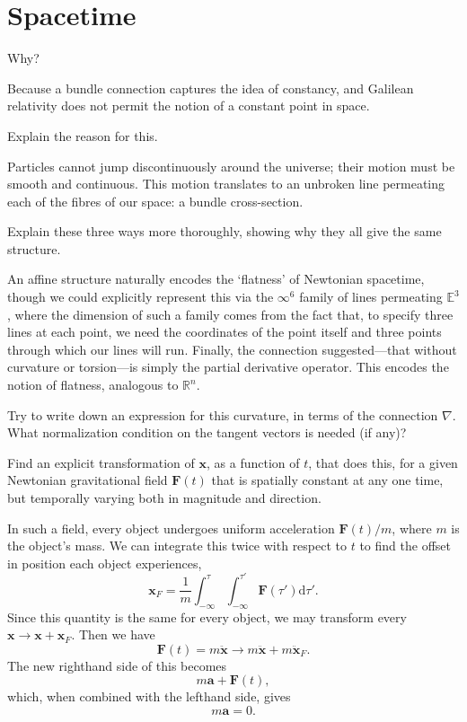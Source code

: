 \documentclass[../the-road-to-reality.tex]{subfiles}
\begin{document}
\section{Spacetime}

\begin{questions}

	\question Why?

	\begin{solution}
		Because a bundle connection captures the idea of constancy, and Galilean relativity does not permit the notion of a constant point in space.
	\end{solution}

	\question Explain the reason for this.

	\begin{solution}
		Particles cannot jump discontinuously around the universe; their motion must be smooth and continuous. This motion translates to an unbroken line permeating each of the fibres of our space: a bundle cross-section.	
	\end{solution}

	\question Explain these three ways more thoroughly, showing why they all give the same structure.

	\begin{solution}
		An affine structure naturally encodes the `flatness' of Newtonian spacetime, though we could explicitly represent this via the $\infty^6$ family of lines permeating $\mathbb{E}^3$, where the dimension of such a family comes from the fact that, to specify three lines at each point, we need the coordinates of the point itself and three points through which our lines will run. Finally, the connection suggested---that without curvature or torsion---is simply the partial derivative operator. This encodes the notion of flatness, analogous to $\mathbb{R}^n$.
	\end{solution}

	\question Try to write down an expression for this curvature, in terms of the connection $\nabla$. What normalization condition on the tangent vectors is needed (if any)?

	\question Find an explicit transformation of $\mathbf{x}$, as a function of $t$, that does this, for a given Newtonian gravitational field $\mathbf{F}(t)$ that is spatially constant at any one time, but temporally varying both in magnitude and direction.

	\begin{solution}
		In such a field, every object undergoes uniform acceleration $\mathbf{F}(t)/m$, where $m$ is the object's mass. We can integrate this twice with respect to $t$ to find the offset in position each object experiences,
		\[
			\mathbf{x}_F = \frac{1}{m}\int_{-\infty}^{\tau}\int_{-\infty}^{\tau'}\mathbf{F}(\tau')\mathrm{d}\tau'
		.\] 
		Since this quantity is the same for every object, we may transform every $\mathbf{x} \to \mathbf{x} + \mathbf{x}_F$. Then we have 
		\[
			\mathbf{F}(t) = m\ddot{\mathbf{x}} \to m\ddot{\mathbf{x}} + m\ddot{\mathbf{x}}_F
		.\] 
		The new righthand side of this becomes
		\[
			m\mathbf{a} + \mathbf{F}(t)
		,\] 
		which, when combined with the lefthand side, gives
		\[
			m\mathbf{a} = 0
		.\] 
	\end{solution}


\end{questions}
\end{document}

